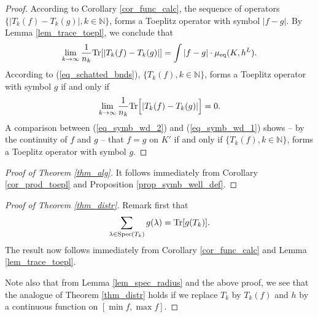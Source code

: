 \documentclass[12pt]{article}
\numberwithin{equation}{section}
\theoremstyle{theorem}
\theoremstyle{definition}
\theoremstyle{remark}
\newcommand{\nat}{\mathbb{N}}
\begin{document}
	\begin{proof}
		According to Corollary \ref{cor_func_calc}, the sequence of operators $\{ |T_k(f) - T_k(g)| , k \in \nat \}$, forms a Toeplitz operator with symbol $|f - g|$.
		By Lemma \ref{lem_trace_toepl}, we conclude that
		\begin{equation}\label{eq_symb_wd_2}
			\lim_{k \to \infty} \frac{1}{n_k} {\rm{Tr}}[|T_k(f) - T_k(g)|] = \int |f - g| \cdot \mu_{\mathrm{eq}}(K, h^L).
		\end{equation}
		According to (\ref{eq_schatted_bnds}), $\{ T_k(f) , k \in \nat \}$, forms a Toeplitz operator with symbol $g$ if and only if
		\begin{equation}\label{eq_symb_wd_1}
			\lim_{k \to \infty} \frac{1}{n_k} {\rm{Tr}} \Big[ |T_k(f) - T_k(g)| \Big] = 0.
		\end{equation}
		A comparison between (\ref{eq_symb_wd_2}) and (\ref{eq_symb_wd_1}) shows -- by the continuity of $f$ and $g$ -- that $f = g$ on $K'$ if and only if $\{ T_k(f) , k \in \nat \}$, forms a Toeplitz operator with symbol $g$.
	\end{proof}
	\begin{proof}[Proof of Theorem \ref{thm_alg}]
		It follows immediately from Corollary \ref{cor_prod_toepl} and Proposition \ref{prop_symb_well_def}.
	\end{proof}
	\begin{proof}[Proof of Theorem \ref{thm_distr}]
		Remark first that 
		\begin{equation}
			\sum_{\lambda \in {\rm{Spec}} (T_k)} g(\lambda)
			=
			{\rm{Tr}}[g(T_k)].
		\end{equation}
		The result now follows immediately from Corollary \ref{cor_func_calc} and Lemma \ref{lem_trace_toepl}.
		\par 
		Note also that from Lemma \ref{lem_spec_radius} and the above proof, we see that the analogue of Theorem \ref{thm_distr} holds if we replace $T_k$ by $T_k(f)$ and $h$ by a continuous function on $[\min f, \max f]$.
	\end{proof}
	
\end{document}

